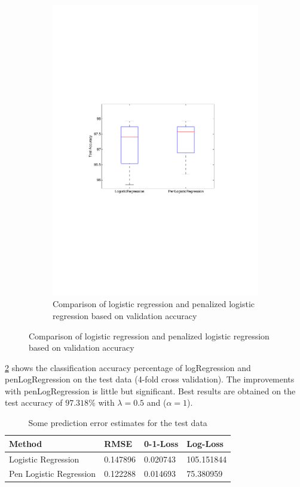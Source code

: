 \begin{figure}[h]
\begin{subfigure}[b]{0.45\textwidth}
    \includegraphics[clip, trim=4cm 10cm 3cm 10cm, width=\textwidth]{figures/comparison_LR_pLR.pdf}
    \caption{Comparison of logistic regression and penalized logistic regression based on validation accuracy}
    \label{fig:comp_LR_pLR}
  \end{subfigure}
\end{figure}


\ref{fig:comp_LR_pLR} shows the classification accuracy percentage  of logRegression and penLogRegression on the test data (4-fold cross validation). The improvements with penLogRegression is little but significant.  
Best results are obtained on the test accuracy of $97.318\%$ with $\lambda=0.5$ and ($\alpha=1$).

\begin{table}[h!]
\begin{center}
    \begin{tabular}{ | l | l | l | p{5cm} |}
    \hline
    Method & RMSE & 0-1-Loss & Log-Loss \\ \hline
    Logistic Regression & 0.147896 & 0.020743 & 105.151844 \\ \hline
    Pen Logistic Regression & 0.122288 & 0.014693 & 75.380959 \\ \hline
    \end{tabular}
\end{center}
\caption{Some prediction error estimates for the test data}
\label{table:test_errors}
\end{table}
 
